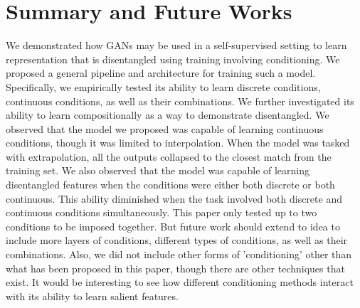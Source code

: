 \documentclass[11pt, letterpaper, oneside]{article}
\begin{document}
\section{Summary and Future Works} \label{Summary}
We demonstrated how GANs may be used in a self-supervised setting to learn representation that is disentangled using training involving conditioning. We proposed a general pipeline and architecture for training such a model. Specifically, we empirically tested its ability to learn discrete conditions, continuous conditions, as well as their combinations. We further investigated its ability to learn compositionally as a way to demonstrate disentangled. We observed that the model we proposed was capable of learning continuous conditions, though it was limited to interpolation. When the model was tasked with extrapolation, all the outputs collapsed to the closest match from the training set. We also observed that the model was capable of learning disentangled features when the conditions were either both discrete or both continuous. This ability diminished when the task involved both discrete and continuous conditions simultaneously.   
This paper only tested up to two conditions to be imposed together. But future work should extend to idea to include more layers of conditions, different types of conditions, as well as their combinations. Also, we did not include other forms of 'conditioning' other than what has been proposed in this paper, though there are other techniques that exist. It would be interesting to see how different conditioning methods interact with its ability to learn salient features.


\printbibliography
\end{document}

